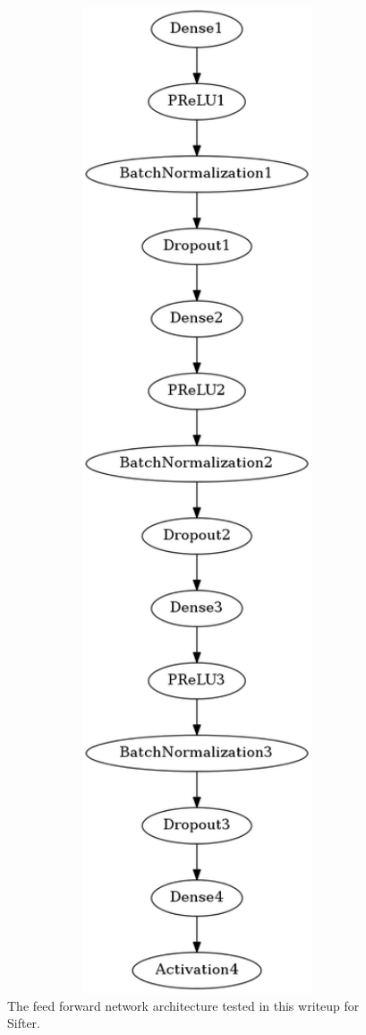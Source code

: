 \documentclass[12pt,twoside]{article}
\begin{document}
\begin{figure}[h]
\centering
\setlength{\abovecaptionskip}{-2.25in}
\includegraphics[angle=90,origin=c,width=1.0\textwidth]{figures/model.png}
\caption{The feed forward network architecture tested in this writeup for Sifter.}
\label{fig:approach}
\end{figure}
\end{document}
